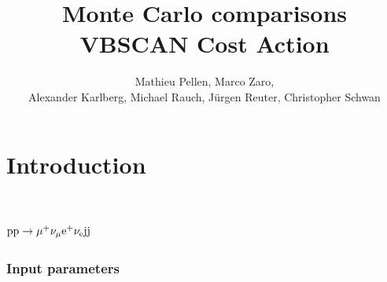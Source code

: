 \documentclass[a4paper,10pt]{report}
\title{Monte Carlo comparisons \\
VBSCAN Cost Action}
\author{Mathieu Pellen, Marco Zaro, \\
Alexander Karlberg, Michael Rauch, J\"urgen Reuter, Christopher Schwan}
\begin{document}
\maketitle

\begin{abstract}

\end{abstract}

\part{Introduction}

\part{$\text{p}\text{p}\to\mu^+\nu_\mu\text{e}^+\nu_{\text{e}}\text{j}\text{j}$}

\section{Input parameters}
\end{document}
